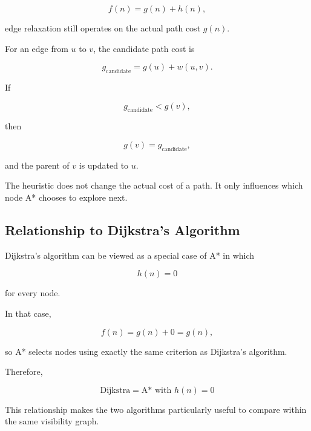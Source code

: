 \[
f(n)=g(n)+h(n),
\]

edge relaxation still operates on the actual path cost $g(n)$.

For an edge from $u$ to $v$, the candidate path cost is

\[
g_{\text{candidate}}
=
g(u)+w(u,v).
\]

If

\[
g_{\text{candidate}}<g(v),
\]

then

\[
g(v)=g_{\text{candidate}},
\]

and the parent of $v$ is updated to $u$.

The heuristic does not change the actual cost of a path. It only influences
which node A* chooses to explore next.

\subsection{Relationship to Dijkstra's Algorithm}

Dijkstra's algorithm can be viewed as a special case of A* in which

\[
h(n)=0
\]

for every node.

In that case,

\[
f(n)
=
g(n)+0
=
g(n),
\]

so A* selects nodes using exactly the same criterion as Dijkstra's
algorithm.

Therefore,

\[
\boxed{
\text{Dijkstra}
=
\text{A* with } h(n)=0
}
\]

This relationship makes the two algorithms particularly useful to compare
within the same visibility graph.